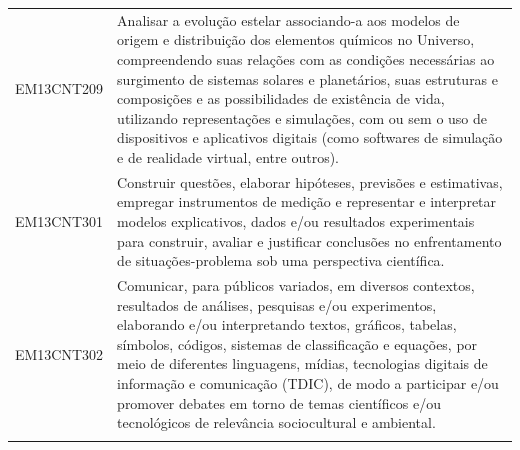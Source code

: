 \documentclass[12pt]{extarticle}
\begin{document}
\begin{longtable}{ll}
EM13CNT209 & Analisar a evolução estelar associando-a aos modelos de origem e distribuição dos elementos químicos no Universo, compreendendo suas relações com as condições necessárias ao surgimento de sistemas solares e planetários, suas estruturas e composições e as possibilidades de existência de vida, utilizando representações e simulações, com ou sem o uso de dispositivos e aplicativos digitais (como softwares de simulação e de realidade virtual, entre outros).                                                                                                                                                                                                                                                                                                                                              \\
\rowcolor[HTML]{FFF} 
EM13CNT301 & Construir questões, elaborar hipóteses, previsões e estimativas, empregar instrumentos de medição e representar e interpretar modelos explicativos, dados e/ou resultados experimentais para construir, avaliar e justificar conclusões no enfrentamento de situações-problema sob uma perspectiva científica.                                                                                                                                                                                                                                                                                                                                                                                                                                                                                                        \\
\rowcolor[HTML]{E0F7FA} 
EM13CNT302 & Comunicar, para públicos variados, em diversos contextos, resultados de análises, pesquisas e/ou experimentos, elaborando e/ou interpretando textos, gráficos, tabelas, símbolos, códigos, sistemas de classificação e equações, por meio de diferentes linguagens, mídias, tecnologias digitais de informação e comunicação (TDIC), de modo a participar e/ou promover debates em torno de temas científicos e/ou tecnológicos de relevância sociocultural e ambiental.                                                                                                                                                                                                                                                                                                                                              \\
\rowcolor[HTML]{FFF} 

\end{longtable}
\end{document}
